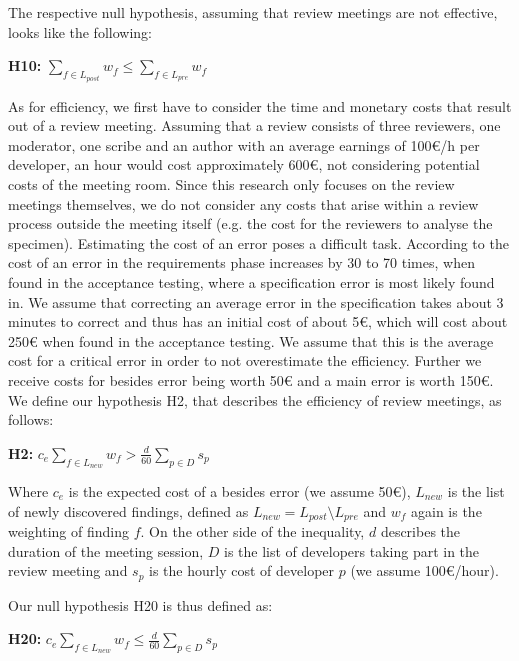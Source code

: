 The respective null hypothesis, assuming that review meetings are not effective, looks like the following:

\begin{center}
	\textbf{H10:} $\sum_{f \in L_{post}} w_f \le \sum_{f \in L_{pre}} w_f$
\end{center}

As for efficiency, we first have to consider the time and monetary costs that result out of a review meeting. Assuming that a review consists of three reviewers, one moderator, one scribe and an author with an average earnings of 100€/h per developer, an hour would cost approximately 600€, not considering potential costs of the meeting room. Since this research only focuses on the review meetings themselves, we do not consider any costs that arise within a review process outside the meeting itself (e.g. the cost for the reviewers to analyse the specimen). Estimating the cost of an error poses a difficult task. According to \cite{stecklein2004error} the cost of an error in the requirements phase increases by 30 to 70 times, when found in the acceptance testing, where a specification error is most likely found in. We assume that correcting an average error in the specification takes about 3 minutes to correct and thus has an initial cost of about 5€, which will cost about 250€ when found in the acceptance testing.
We assume that this is the average cost for a critical error in order to not overestimate the efficiency. Further we receive costs for besides error being worth 50€ and a main error is worth 150€. We define our hypothesis H2, that describes the efficiency of review meetings, as follows:

\begin{center}
	\textbf{H2:} $c_e \sum_{f \in L_{new}} w_f > \frac{d}{60} \sum_{p \in D} s_p$
\end{center}

Where $c_e$ is the expected cost of a besides error (we assume 50€), $L_{new}$ is the list of newly discovered findings, defined as $L_{new} = L_{post} \setminus L_{pre}$ and $w_f$ again is the weighting of finding $f$. On the other side of the inequality, $d$ describes the duration of the meeting session, $D$ is the list of developers taking part in the review meeting and $s_p$ is the hourly cost of developer $p$ (we assume 100€/hour).

Our null hypothesis H20 is thus defined as:

\begin{center}
	\textbf{H20:} $c_e \sum_{f \in L_{new}} w_f \le \frac{d}{60} \sum_{p \in D} s_p$
\end{center} 

